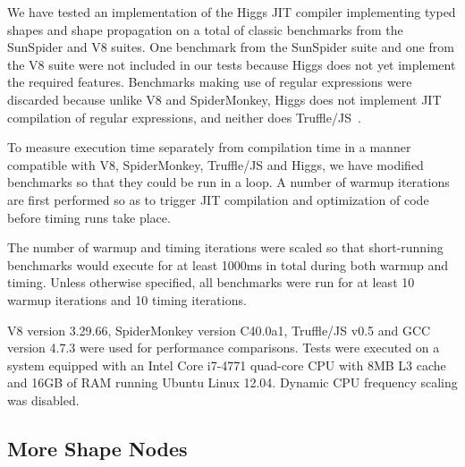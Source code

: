 \documentclass[preprint]{sigplanconf}
\newcommand{\stat}[1]{\unskip}
\begin{document}
We have tested an implementation of the Higgs JIT compiler implementing typed
shapes and shape propagation on a
total of \stat{num_benchs} classic benchmarks from the SunSpider and V8
suites. One benchmark from the SunSpider suite and one from the V8 suite were
not included in our tests because Higgs does not yet implement the required
features. Benchmarks making use of regular expressions were
discarded because unlike V8 and SpiderMonkey, Higgs does not implement JIT
compilation of regular expressions, and neither does
Truffle/JS~\cite{trufflejs, truffle}.

To measure execution time separately from compilation time in a manner
compatible with V8, SpiderMonkey, Truffle/JS and Higgs, we have modified
benchmarks so that they could be run in a loop. A number of warmup iterations
are first performed so as to trigger JIT compilation and optimization of code
before timing runs take place.

The number of warmup and timing iterations were scaled so that short-running
benchmarks would execute for at least 1000ms in total during both warmup and
timing. Unless otherwise specified, all benchmarks were run for at least 10
warmup iterations and 10 timing iterations.

V8 version 3.29.66, SpiderMonkey version C40.0a1, Truffle/JS v0.5 and GCC
version 4.7.3 were used for performance comparisons. Tests were executed on a
system equipped with an Intel Core i7-4771 quad-core CPU with 8MB L3 cache
and 16GB of RAM running Ubuntu Linux 12.04. Dynamic CPU frequency scaling was
disabled.

\subsection{More Shape Nodes}
\end{document}
